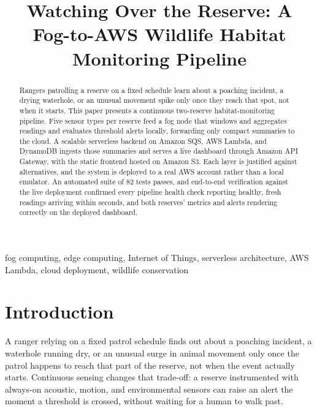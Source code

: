 \documentclass[conference,a4paper]{IEEEtran}
\begin{document}
\title{Watching Over the Reserve: A Fog-to-AWS Wildlife Habitat Monitoring Pipeline}

\author{
}

\maketitle

\begin{abstract}
Rangers patrolling a reserve on a fixed schedule learn about a poaching incident, a drying waterhole, or an unusual movement spike only once they reach that spot, not when it starts. This paper presents a continuous two-reserve habitat-monitoring pipeline. Five sensor types per reserve feed a fog node that windows and aggregates readings and evaluates threshold alerts locally, forwarding only compact summaries to the cloud. A scalable serverless backend on Amazon SQS, AWS Lambda, and DynamoDB ingests those summaries and serves a live dashboard through Amazon API Gateway, with the static frontend hosted on Amazon S3. Each layer is justified against alternatives, and the system is deployed to a real AWS account rather than a local emulator. An automated suite of 82 tests passes, and end-to-end verification against the live deployment confirmed every pipeline health check reporting healthy, fresh readings arriving within seconds, and both reserves' metrics and alerts rendering correctly on the deployed dashboard.
\end{abstract}

\begin{IEEEkeywords}
fog computing, edge computing, Internet of Things, serverless architecture, AWS Lambda, cloud deployment, wildlife conservation
\end{IEEEkeywords}

\section{Introduction}

A ranger relying on a fixed patrol schedule finds out about a poaching incident, a waterhole running dry, or an unusual surge in animal movement only once the patrol happens to reach that part of the reserve, not when the event actually starts. Continuous sensing changes that trade-off: a reserve instrumented with always-on acoustic, motion, and environmental sensors can raise an alert the moment a threshold is crossed, without waiting for a human to walk past.
\end{document}
